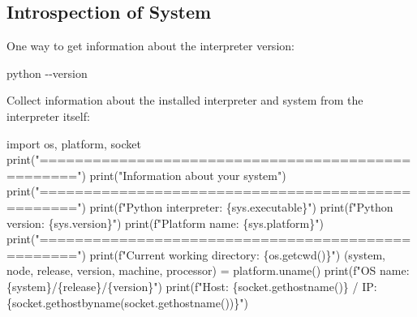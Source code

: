 \documentclass[
]{article}
\newenvironment{Shaded}{}{}
\newcommand{\AttributeTok}[1]{\textcolor[rgb]{0.49,0.56,0.16}{#1}}
\newcommand{\BuiltInTok}[1]{#1}
\newcommand{\ExtensionTok}[1]{#1}
\newcommand{\ImportTok}[1]{#1}
\newcommand{\NormalTok}[1]{#1}
\newcommand{\OperatorTok}[1]{\textcolor[rgb]{0.40,0.40,0.40}{#1}}
\newcommand{\SpecialCharTok}[1]{\textcolor[rgb]{0.25,0.44,0.63}{#1}}
\newcommand{\SpecialStringTok}[1]{\textcolor[rgb]{0.73,0.40,0.53}{#1}}
\newcommand{\StringTok}[1]{\textcolor[rgb]{0.25,0.44,0.63}{#1}}
\begin{document}
\hypertarget{introspection-of-system}{%
\subsection{Introspection of System}\label{introspection-of-system}}

One way to get information about the interpreter version:

\begin{Shaded}
\begin{Highlighting}[]
\ExtensionTok{python} \AttributeTok{{-}{-}version}
\end{Highlighting}
\end{Shaded}

Collect information about the installed interpreter and system from the
interpreter itself:

\begin{Shaded}
\begin{Highlighting}[]
\ImportTok{import}\NormalTok{ os, platform, socket}
\BuiltInTok{print}\NormalTok{(}\StringTok{"=================================================="}\NormalTok{)}
\BuiltInTok{print}\NormalTok{(}\StringTok{"Information about your system"}\NormalTok{)}
\BuiltInTok{print}\NormalTok{(}\StringTok{"=================================================="}\NormalTok{)}
\BuiltInTok{print}\NormalTok{(}\SpecialStringTok{f"Python interpreter: }\SpecialCharTok{\{}\NormalTok{sys}\SpecialCharTok{.}\NormalTok{executable}\SpecialCharTok{\}}\SpecialStringTok{"}\NormalTok{)}
\BuiltInTok{print}\NormalTok{(}\SpecialStringTok{f"Python version: }\SpecialCharTok{\{}\NormalTok{sys}\SpecialCharTok{.}\NormalTok{version}\SpecialCharTok{\}}\SpecialStringTok{"}\NormalTok{)}
\BuiltInTok{print}\NormalTok{(}\SpecialStringTok{f"Platform name: }\SpecialCharTok{\{}\NormalTok{sys}\SpecialCharTok{.}\NormalTok{platform}\SpecialCharTok{\}}\SpecialStringTok{"}\NormalTok{)}
\BuiltInTok{print}\NormalTok{(}\StringTok{"=================================================="}\NormalTok{)}
\BuiltInTok{print}\NormalTok{(}\SpecialStringTok{f"Current working directory: }\SpecialCharTok{\{}\NormalTok{os}\SpecialCharTok{.}\NormalTok{getcwd()}\SpecialCharTok{\}}\SpecialStringTok{"}\NormalTok{)}
\NormalTok{(system, node, release, version, machine, processor) }\OperatorTok{=}\NormalTok{ platform.uname()}
\BuiltInTok{print}\NormalTok{(}\SpecialStringTok{f"OS name: }\SpecialCharTok{\{}\NormalTok{system}\SpecialCharTok{\}}\SpecialStringTok{/}\SpecialCharTok{\{}\NormalTok{release}\SpecialCharTok{\}}\SpecialStringTok{/}\SpecialCharTok{\{}\NormalTok{version}\SpecialCharTok{\}}\SpecialStringTok{"}\NormalTok{)}
\BuiltInTok{print}\NormalTok{(}\SpecialStringTok{f"Host: }\SpecialCharTok{\{}\NormalTok{socket}\SpecialCharTok{.}\NormalTok{gethostname()}\SpecialCharTok{\}}\SpecialStringTok{ / IP: }\SpecialCharTok{\{}\NormalTok{socket}\SpecialCharTok{.}\NormalTok{gethostbyname(socket.gethostname())}\SpecialCharTok{\}}\SpecialStringTok{"}\NormalTok{)}
\end{Highlighting}
\end{Shaded}
\end{document}
